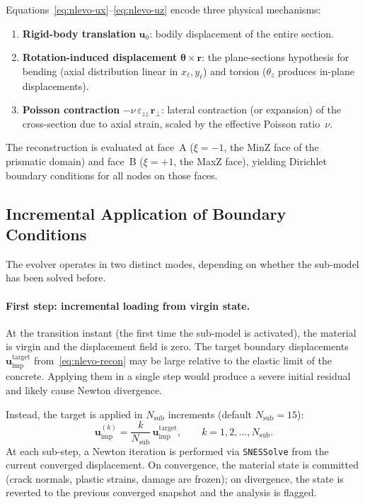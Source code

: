 Equations~\eqref{eq:nlevo-ux}--\eqref{eq:nlevo-uz} encode three
physical mechanisms:
\begin{enumerate}
  \item \textbf{Rigid-body translation} $\mathbf{u}_0$: bodily
        displacement of the entire section.
  \item \textbf{Rotation-induced displacement}
        $\boldsymbol{\theta} \times \mathbf{r}$: the plane-sections
        hypothesis for bending (axial distribution linear in
        $x_\ell, y_\ell$) and torsion ($\theta_z$ produces in-plane
        displacements).
  \item \textbf{Poisson contraction}
        $-\nu\,\varepsilon_{zz}\,\mathbf{r}_\perp$: lateral contraction
        (or expansion) of the cross-section due to axial strain, scaled
        by the effective Poisson ratio~$\nu$.
\end{enumerate}

The reconstruction is evaluated at face~A ($\xi = -1$, the MinZ face
of the prismatic domain) and face~B ($\xi = +1$, the MaxZ face),
yielding Dirichlet boundary conditions for all nodes on those faces.


\subsection{Incremental Application of Boundary Conditions}
\label{ssec:nlevo-incremental-bc}

The evolver operates in two distinct modes, depending on whether the
sub-model has been solved before.

\paragraph{First step: incremental loading from virgin state.}
At the transition instant (the first time the sub-model is activated),
the material is virgin and the displacement field is zero.  The
target boundary displacements $\mathbf{u}^{\mathrm{target}}_{\mathrm{imp}}$
from~\eqref{eq:nlevo-recon} may be large relative to the elastic
limit of the concrete.  Applying them in a single step would
produce a severe initial residual and likely cause Newton divergence.

Instead, the target is applied in $N_{\mathrm{sub}}$ increments
(default $N_{\mathrm{sub}} = 15$):
\begin{equation}
  \mathbf{u}_{\mathrm{imp}}^{(k)}
  = \frac{k}{N_{\mathrm{sub}}}\,
    \mathbf{u}^{\mathrm{target}}_{\mathrm{imp}},
  \qquad k = 1, 2, \ldots, N_{\mathrm{sub}}.
  \label{eq:nlevo-incremental}
\end{equation}
At each sub-step, a Newton iteration is performed via
\texttt{SNESSolve} from the current converged displacement.  On
convergence, the material state is committed (crack normals, plastic
strains, damage are frozen); on divergence, the state is reverted
to the previous converged snapshot and the analysis is flagged.

